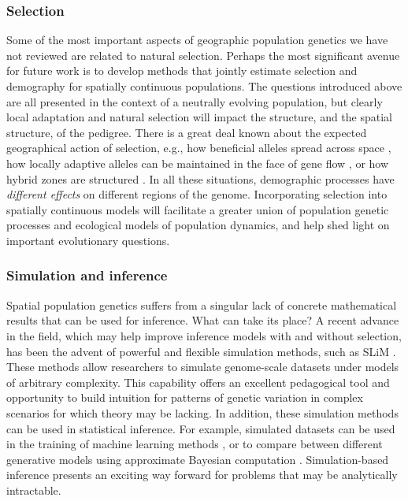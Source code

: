 \documentclass{ar-1col}
\renewcommand{\emph}[1]{{\textit{#1}}}
\begin{document}
\subsubsection{Selection}

Some of the most important aspects of geographic population genetics
we have not reviewed are related to natural selection.
Perhaps the most significant avenue for future work is to 
develop methods that jointly estimate selection and demography for spatially continuous populations. 
The questions introduced above are all presented in the context 
of a neutrally evolving population,
but clearly local adaptation and natural selection will impact 
the structure, and the spatial structure, of the pedigree.
There is a great deal known about the expected geographical action of selection,
e.g., how beneficial alleles spread across space \citep{fisher1932,hallatschek,ralph2010},
how locally adaptive alleles can be maintained in the face of gene flow \citep{slatkin_local,barton,ralph_patchy},
or how hybrid zones are structured \citep{barton_hybrid,sedghifar}.
In all these situations,
demographic processes have \emph{different effects} on different regions of the genome.
Incorporating selection into spatially continuous models 
will facilitate a greater union of population genetic processes 
and ecological models of population dynamics, 
and help shed light on important evolutionary questions.


\subsubsection{Simulation and inference} 

Spatial population genetics suffers from a singular lack of concrete mathematical results
that can be used for inference.
What can take its place?
A recent advance in the field, 
which may help improve inference models with and without selection, 
has been the advent of powerful and flexible simulation methods, 
such as SLiM \citep{haller2018forward,haller2018treesequence,kelleher2018efficient}.
These methods allow
researchers to simulate genome-scale datasets under models of arbitrary complexity.
This capability offers an excellent pedagogical tool 
and opportunity to build intuition for patterns of genetic variation 
in complex scenarios for which theory may be lacking.
In addition, these simulation methods can be used in statistical inference.
For example, simulated datasets can be used in the training 
of machine learning methods \citep[e.g.,][]{SchriderKern2018}, 
or to compare between different generative models using 
approximate Bayesian computation \citep{MarjoramTavare2006modern}.
Simulation-based inference presents an exciting way forward 
for problems that may be analytically intractable.
\end{document}
